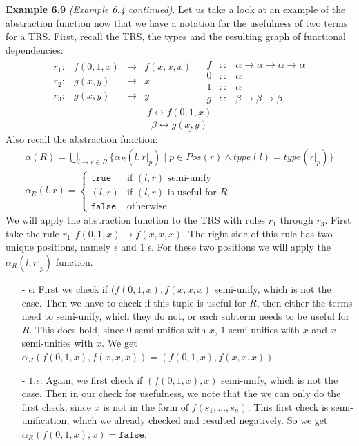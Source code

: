 \textbf{Example 6.9} \textit{(Example 6.4 continued)}. Let us take a look at an example of the abstraction function now that we have a notation for the usefulness of two terms for a TRS. First, recall the TRS, the types and the resulting graph of functional dependencies:
\[
\begin{array}{rl}
\begin{array}{lrcl}
    r_1: & f(0, 1, x) & \rightarrow & f(x, x, x) \\
    r_2: & g(x, y) & \rightarrow & x \\
    r_3: & g(x, y) & \rightarrow & y
\end{array} &
\begin{array}{rcl}
    f & :: & \alpha \rightarrow \alpha \rightarrow \alpha \rightarrow \alpha \\
    0 & :: & \alpha \\
    1 & :: & \alpha \\
    g & :: & \beta \rightarrow \beta \rightarrow \beta 
\end{array}
\end{array}
\]
\[
f \longleftrightarrow \underline{f(0, 1, x)} 
\]
\[
\beta \longleftrightarrow \underline{g(x,y)}
\]
Also recall the abstraction function:
\[
\begin{array}{c}
\alpha(R) = \bigcup\limits_{l \rightarrow r \in R} \{\alpha_R(l, \left.r\right|_p) \mid p \in \textit{Pos}(r) \land \textit{type}(l) = \textit{type}(\left.r\right|_p)\} \\
\alpha_R(l, r) =
\left\{
    \begin{array}{ll}
        \texttt{true} & \text{if } (l, r) \text{ semi-unify}\\
        (l, r) & \text{if } (l, r) \text{ is useful for } R\\
        \texttt{false} & \text{otherwise}
    \end{array}
\right.
\end{array}
\]
We will apply the abstraction function to the TRS with rules $r_1$ through $r_3$. First take the rule $r_1 : f(0, 1, x) \rightarrow f(x, x, x)$. The right side of this rule has two unique positions, namely $\epsilon$ and $1.\epsilon$. For these two positions we will apply the $\alpha_R(l, \left.r\right|_p)$ function.
\begin{itemize}
    \itemsep 0em
    \item[-] $\epsilon$: First we check if $(f(0, 1, x), f(x,x,x)$ semi-unify, which is not the case. Then we have to check if this tuple is useful for $R$, then either the terms need to semi-unify, which they do not, or each subterm needs to be useful for $R$. This does hold, since $0$ semi-unifies with $x$, $1$ semi-unifies with $x$ and $x$ semi-unifies with $x$. We get $\alpha_R(f(0, 1, x), f(x,x,x)) = (f(0, 1, x), f(x,x,x))$.
    \item[-] $1.\epsilon$: Again, we first check if $(f(0, 1, x), x)$ semi-unify, which is not the case. Then in our check for usefulness, we note that the we can only do the first check, since $x$ is not in the form of $f(s_1, \dots, s_n)$. This first check is semi-unification, which we already checked and resulted negatively. So we get $\alpha_R(f(0, 1, x), x) = \texttt{false}$.
\end{itemize}

